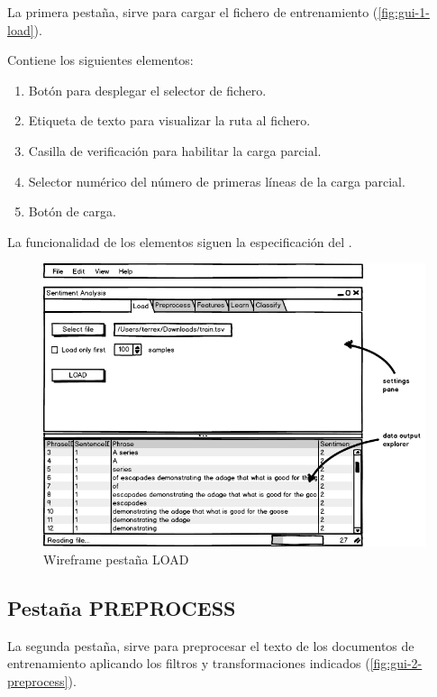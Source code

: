 La primera pestaña,  sirve para cargar el fichero de entrenamiento  (\autoref{fig:gui-1-load}).

Contiene los siguientes elementos:
\begin{enumerate}
\item Botón para desplegar el selector de fichero.
\item Etiqueta de texto para visualizar la ruta al fichero.
\item Casilla de verificación para habilitar la carga parcial.
\item Selector numérico del número de primeras líneas de la carga parcial.
\item Botón de carga.
\end{enumerate}

La funcionalidad de los elementos siguen la especificación del .

\begin{figure}[htbp]
\centering
\includegraphics[width=14cm]{gui-1-load}
\caption{Wireframe pestaña LOAD}
\label{fig:gui-1-load}
\end{figure}

\FloatBarrier
\newpage
\subsection{Pestaña PREPROCESS}

La segunda pestaña,  sirve para preprocesar el texto de los documentos de entrenamiento aplicando los filtros y transformaciones indicados (\autoref{fig:gui-2-preprocess}).

